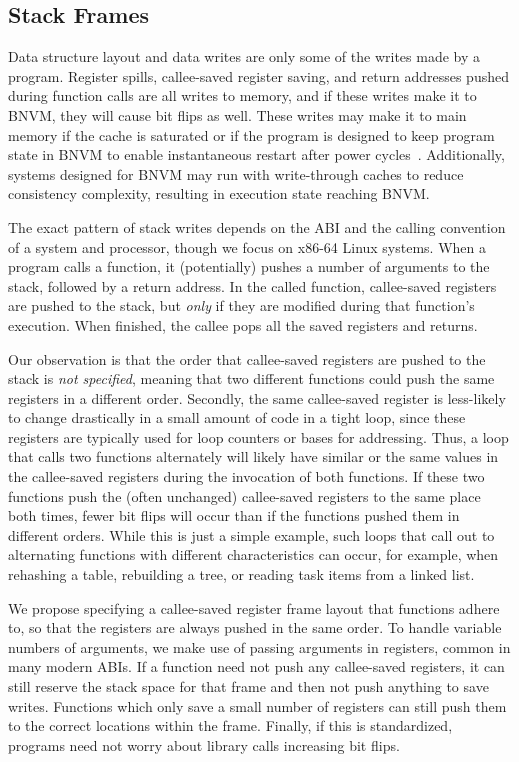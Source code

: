 \subsection{Stack Frames}
\label{sec:stack}

Data structure layout and data writes are only some of the writes made by a
program. Register spills, callee-saved register saving,
and return addresses pushed during function calls are all writes to memory, and
if these writes make it to BNVM, they will cause bit flips as well. These writes
may make it to main memory if the cache is saturated or if the program is
designed to keep program state in BNVM to enable instantaneous restart after
power cycles~\cite{Narayanan:asplos12}. Additionally, systems designed for BNVM may run with write-through
caches to reduce consistency complexity, resulting in execution state reaching
BNVM.

The exact pattern of stack writes depends on the ABI and the calling convention of a system and
processor, though we focus on x86-64 Linux systems. When a program calls a function, it
(potentially) pushes a number of arguments to the stack, followed by a return address.  In the
called function, callee-saved registers are pushed to the stack, but \emph{only} if they are modified
during that function's execution. When finished, the callee pops all the saved registers and
returns.

Our observation is that the order that callee-saved registers are pushed to the
stack is \textit{not specified}, meaning that two different functions could push
the same registers in a different order. Secondly, the same callee-saved register
is less-likely to change drastically in a small amount of code in a tight loop,
since these registers are typically used for loop counters or bases for
addressing. Thus, a loop that calls two functions alternately will likely have
similar or the same values in the callee-saved registers during the invocation
of both functions.
If these two functions push the (often unchanged)
callee-saved registers to the same place both times, fewer bit
flips will occur than if the functions pushed them in different orders.
While this is just a simple example,
such loops that call out to alternating functions with different characteristics can occur, for
example, when rehashing a table, rebuilding a tree, or reading task items from a linked
list.

We propose specifying a callee-saved register frame layout that functions adhere
to, so that the registers are always pushed in the same order. To handle
variable numbers of arguments, we make use of passing arguments in registers,
common in many modern ABIs. If a function
need not push any callee-saved registers, it can still reserve the stack space
for that frame and then not push anything to save writes. Functions which only
save a small number of registers can still push them to the correct locations
within the frame. Finally, if this is standardized, programs need not worry
about library calls increasing bit flips.

